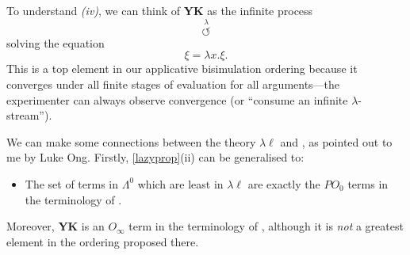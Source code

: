To understand {\em (iv)}, we can think of {\bf YK} as the infinite process \[ \stackrel{\lambda}{\circlearrowleft} \]
solving the equation
\[ \xi = \lambda x . \xi . \]
This is a top element in our applicative bisimulation ordering because it converges under all finite stages of evaluation for all arguments---the experimenter can always observe convergence (or ``consume an infinite $\lambda$-stream'').

We can make some connections between the theory $\lambda \ell$ and \cite{Lon83}, as pointed out to me by Luke Ong. Firstly, \ref{lazyprop}(ii) can be generalised to:
\begin{itemize}
\item The set of terms in $\Lambda^{0}$ which are least in $\lambda \ell$ 
are exactly the $PO_{0}$ terms in the terminology of \cite{Lon83}.
\end{itemize}
Moreover, {\bf YK} is an $O_{\infty}$ term in the terminology of \cite{Lon83}, although it is {\em not} a greatest element in the ordering proposed there.

